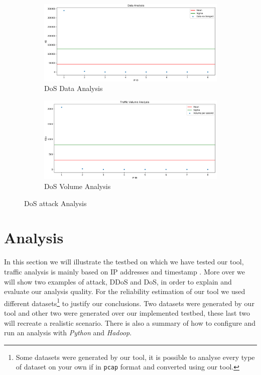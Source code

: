 \begin{figure}[h]
	\begin{subfigure}{0.48\textwidth}
		\includegraphics[width=\textwidth]{imgs/DoSMixed-data_analysis.png}
  		\caption{DoS Data Analysis}
  		\label{fig:ddos_data}
	\end{subfigure}
	\hspace*{\fill} %
	\begin{subfigure}{0.48\textwidth}
  		\includegraphics[width=\textwidth]{imgs/DoSMixed-volume_analysis.png}
  		\caption{DoS Volume Analysis}
  		\label{fig:dos_volume}
	\end{subfigure}
	\caption{DoS attack Analysis}
	\label{fig:dos_analysis}
\end{figure}

\section{Analysis}
\label{sec:analysis}
In this section we will illustrate the testbed on which we have tested our tool, traffic analysis is mainly based on IP addresses and timestamp \cite{ddos_forensics}. 
More over we will show two examples of attack, DDoS and DoS, in order to explain and evaluate our analysis quality.
For the reliability estimation of our tool we used different datasets\footnote{Some datasets were generated by our tool, it is possible to analyse every type of dataset on your own if in \texttt{pcap} format and converted using our tool.} to justify our conclusions. 
Two datasets were generated by our tool and other two were generated over our implemented testbed, these last two will recreate a realistic scenario.
There is also a summary of how to configure and run an analysis with \textit{Python} and \textit{Hadoop}.

